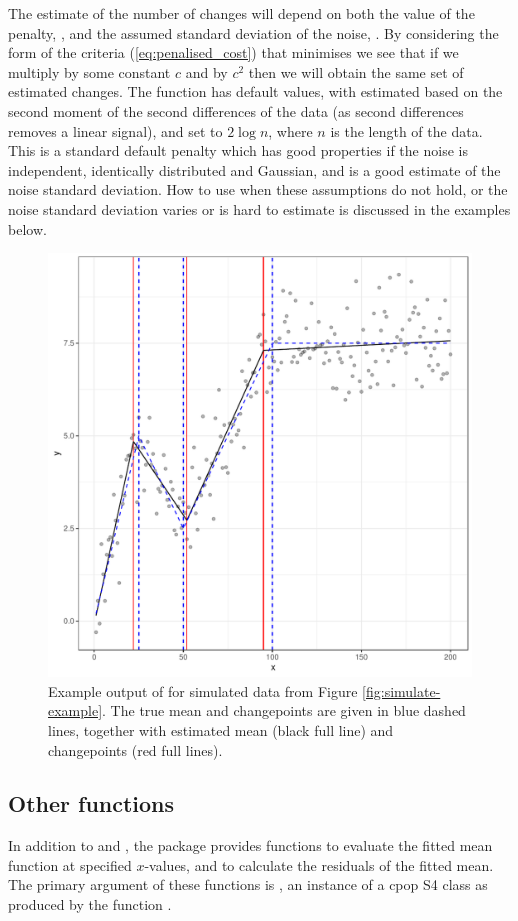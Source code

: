 \documentclass[article]{jss}
\begin{document}
The estimate of the number of changes will depend on both the value of the penalty, , and the assumed standard deviation of the noise, . By considering the form of the criteria (\ref{eq:penalised_cost}) that  minimises we see that if we multiply  by some constant $c$ and  by $c^2$ then we will obtain the same set of estimated changes. The function  has default values, with  estimated based on the second moment of the second differences of the data (as second differences removes a linear signal), and  set to $2\log n$, where $n$ is the length of the data. This is a standard default penalty which has good properties if the noise is independent, identically distributed and Gaussian, and  is a good estimate of the noise standard deviation. How to use  when these assumptions do not hold, or the noise standard deviation varies or is hard to estimate is discussed in the examples below.
 
\begin{figure}
\centering
\includegraphics[width=0.6\linewidth]{figures/cpop_example1_ggplot.pdf}
\caption{Example output of  for simulated data from Figure \ref{fig:simulate-example}. The true mean and changepoints are given in blue dashed lines, together with estimated mean (black full line) and changepoints (red full lines).   }
\label{fig:cpop-example}
\end{figure}
%
%
\subsection{Other functions}
%
%
In addition to  and , the  package provides functions to evaluate the fitted mean function at specified $x$-values, and to calculate the residuals of the fitted mean. The primary argument of these functions is , an instance of a cpop S4 class as produced by the function .
\end{document}
